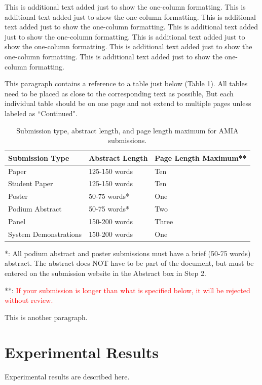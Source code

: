 \documentclass{amia}
\begin{document}
This is additional text added just to show the one-column formatting.  This is additional text added just to show the one-column formatting.  This is additional text added just to show the one-column formatting.  This is additional text added just to show the one-column formatting.  This is additional text added just to show the one-column formatting.  This is additional text added just to show the one-column formatting.  This is additional text added just to show the one-column formatting.

This paragraph contains a reference to a table just below (Table 1).  All tables need to be placed as close to the corresponding text as possible, But each individual table should be on one page and not extend to multiple pages unless labeled as ``Continued".

\begin{table}[h]
\centering
\caption{Submission type, abstract length, and page length maximum for AMIA submissions.}
  \begin{tabular}{|l|l|l|}
  \hline
    \textbf{Submission Type}    & \textbf{Abstract Length}  & \textbf{Page Length Maximum**} \\ \hline
    Paper  & 125-150 words  & Ten   \\ \hline
    Student Paper  & 125-150 words  & Ten \\ \hline
    Poster  &50-75 words*   & One \\ \hline
    Podium  Abstract & 50-75 words*  & Two \\ \hline
    Panel   &150-200 words  & Three \\ \hline
    System Demonstrations    &150-200 words  & One \\ \hline
  \end{tabular}
\end{table}
*: All podium abstract and poster submissions must have a brief (50-75 words) abstract. The abstract does NOT have to be part of the document, but must be entered on the submission website in the Abstract box in Step 2.

**: \textcolor{red}{If your submission is longer than what is specified below, it will be rejected without review.}

This is another paragraph.

\section*{Experimental Results}
Experimental results are described here.
\end{document}
